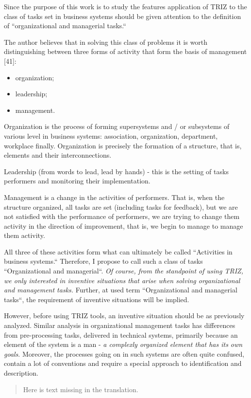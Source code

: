 \documentclass[11pt,a4paper]{book}
\newcommand{\Missing}{
  \begin{quote} Here is text missing in the translation.\end{quote}
}
\begin{document}
Since the purpose of this work is to study the features application of TRIZ to
the class of tasks set in business systems should be given attention to the
definition of “organizational and managerial tasks.“

The author believes that in solving this class of problems it is worth
distinguishing between three forms of activity that form the basis of
management [41]:
\begin{itemize}
\item organization;
\item leadership;
\item management.
\end{itemize}
Organization is the process of forming supersystems and / or subsystems of
various level in business systems: association, organization, department,
workplace finally.  Organization is precisely the formation of a structure,
that is, elements and their interconnections.

Leadership (from words to lead, lead by hands) - this is the setting of tasks
performers and monitoring their implementation.

Management is a change in the activities of performers. That is, when the
structure organized, all tasks are set (including tasks for feedback), but we
are not satisfied with the performance of performers, we are trying to change
them activity in the direction of improvement, that is, we begin to manage to
manage them activity.

All three of these activities form what can ultimately be called “Activities
in business systems.“ Therefore, I propose to call such a class of tasks
“Organizational and managerial“. \emph{Of course, from the standpoint of using
  TRIZ, we only interested in inventive situations that arise when solving
  organizational and management tasks.}  Further, at used term “Organizational
and managerial tasks“, the requirement of inventive situations will be
implied.

However, before using TRIZ tools, an inventive situation should be as
previously analyzed. Similar analysis in organizational management tasks has
differences from pre-processing tasks, delivered in technical systems,
primarily because an element of the system is a man - \emph{a complexly
  organized element that has its own goals}. Moreover, the processes going on
in such systems are often quite confused, contain a lot of conventions and
require a special approach to identification and description.

\Missing
\end{document}
